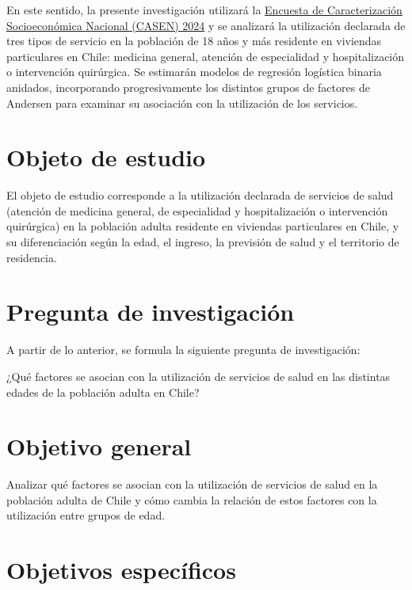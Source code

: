 \documentclass[
  spanish,
  a4paper,
  oneside]{scrbook}
\begin{document}
En este sentido, la presente investigación utilizará la
\href{https://observatorio.ministeriodesarrollosocial.gob.cl/encuesta-casen-2024}{Encuesta
de Caracterización Socioeconómica Nacional (CASEN) 2024} y se analizará
la utilización declarada de tres tipos de servicio en la población de 18
años y más residente en viviendas particulares en Chile: medicina
general, atención de especialidad y hospitalización o intervención
quirúrgica. Se estimarán modelos de regresión logística binaria
anidados, incorporando progresivamente los distintos grupos de factores
de Andersen para examinar su asociación con la utilización de los
servicios.

\section{Objeto de estudio}\label{objeto-de-estudio}

El objeto de estudio corresponde a la utilización declarada de servicios
de salud (atención de medicina general, de especialidad y
hospitalización o intervención quirúrgica) en la población adulta
residente en viviendas particulares en Chile, y su diferenciación según
la edad, el ingreso, la previsión de salud y el territorio de
residencia.

\section{Pregunta de investigación}\label{pregunta-de-investigaciuxf3n}

A partir de lo anterior, se formula la siguiente pregunta de
investigación:

¿Qué factores se asocian con la utilización de servicios de salud en las
distintas edades de la población adulta en Chile?

\section{Objetivo general}\label{objetivo-general}

Analizar qué factores se asocian con la utilización de servicios de
salud en la población adulta de Chile y cómo cambia la relación de estos
factores con la utilización entre grupos de edad.

\section{Objetivos específicos}\label{objetivos-especuxedficos}
\end{document}
